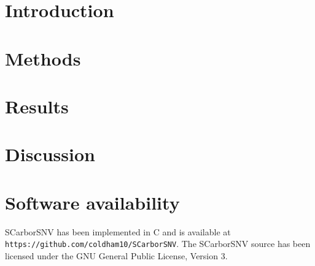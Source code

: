 \documentclass{article}
\begin{document}
\nocite{*}



\doublespacing
\setcounter{page}{2}


\tableofcontents

\newpage
\setcounter{page}{1}

\section{Introduction}


\section{Methods}


\section{Results}


\section{Discussion}



\section{Software availability}
SCarborSNV has been implemented in C and is available at \texttt{https://github.com/coldham10/SCarborSNV}. 
The SCarborSNV source has been licensed under the GNU General Public License, Version 3.




\newpage



\newpage
\appendix

\end{document}

